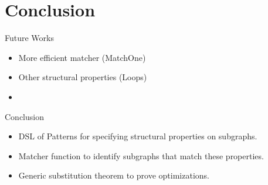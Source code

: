 \documentclass{beamer}
\begin{document}





  


\section{Conclusion}

\begin{frame}{Future Works}
  \begin{itemize}
    \item More efficient matcher (MatchOne)
    \item Other structural properties (Loops)
    \item 
  \end{itemize}
\end{frame}

\begin{frame}{Conclusion}
  \begin{itemize}
    \item DSL of Patterns for specifying structural properties on subgraphs.
    \item Matcher function to identify subgraphs that match these properties.
    \item Generic substitution theorem to prove optimizations.
  \end{itemize}
\end{frame}
\end{document}
